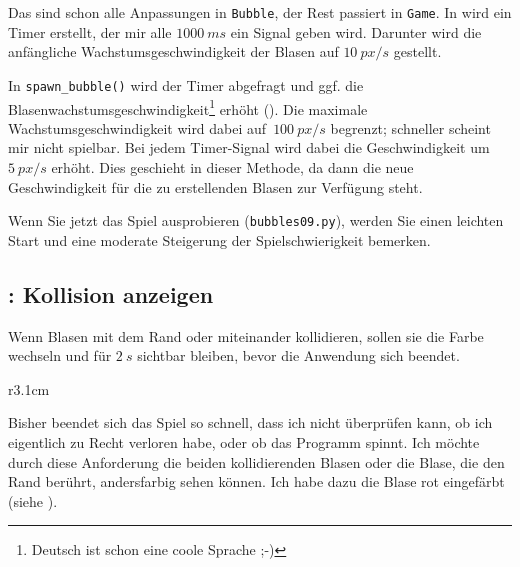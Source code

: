 Das sind schon alle Anpassungen in \texttt{Bubble}, der Rest passiert in \texttt{Game}. In  wird ein Timer erstellt, der mir alle $1000~ms$ ein Signal geben wird. Darunter wird die anfängliche Wachstumsgeschwindigkeit der Blasen auf $10~px/s$ gestellt.


In \texttt{spawn\_bubble()} wird der Timer abgefragt und ggf. die Blasenwachstumsgeschwindigkeit\footnote{Deutsch ist schon eine coole Sprache ;-)} erhöht (). Die maximale Wachstumsgeschwindigkeit wird dabei auf~$100~px/s$ begrenzt; schneller scheint mir nicht spielbar. Bei jedem Timer-Signal wird dabei die Geschwindigkeit um~$5~px/s$ erhöht. Dies geschieht in dieser Methode, da dann die neue Geschwindigkeit für die zu erstellenden Blasen zur Verfügung steht.



Wenn Sie jetzt das Spiel ausprobieren (\texttt{bubbles09.py}), werden Sie einen leichten Start und eine moderate Steigerung der Spielschwierigkeit bemerken.

\subsection{: Kollision anzeigen}
	Wenn Blasen mit dem Rand oder miteinander kollidieren, sollen sie die Farbe wechseln und für $2~s$ sichtbar bleiben, bevor die Anwendung sich beendet.
\er

\begin{wrapfigure}[6]{r}{3.1cm}%
	\begin{center}%
		\vspace{-1cm}%
	\end{center}%
\end{wrapfigure}%
Bisher beendet sich das Spiel so schnell, dass ich nicht überprüfen kann, ob ich eigentlich zu Recht verloren habe, oder ob das Programm spinnt. Ich möchte durch diese Anforderung die beiden kollidierenden Blasen oder die Blase, die den Rand berührt, andersfarbig sehen können. Ich habe dazu die Blase rot eingefärbt (siehe ). 

